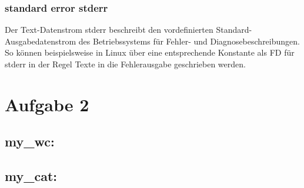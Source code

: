 \documentclass[numbers=noendperiod]{scrartcl}
\begin{document}
\subsubsection*{standard error stderr}
Der Text-Datenstrom stderr beschreibt den vordefinierten Standard-Ausgabedatenstrom des Betriebssystems für Fehler- und Diagnosebeschreibungen. So können beispielsweise in Linux über eine entsprechende Konstante als FD für stderr in der Regel Texte in die Fehlerausgabe geschrieben werden.

\section{Aufgabe 2}

\subsection{my\_wc:}

\subsection{my\_cat:}
\end{document}
